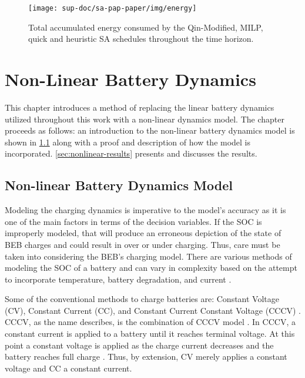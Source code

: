 \documentclass[ee,thesis]{usuthesis}
\begin{document}
\begin{figure}[htpb]
\centering \texttt{[image: sup-doc/sa-pap-paper/img/energy]}
    \caption{Total accumulated energy consumed by the Qin-Modified, MILP, quick and heuristic SA schedules throughout the time horizon.}
    \label{fig:energy-usage}
\end{figure}

\chapter{Non-Linear Battery Dynamics}
\label{sec:nonlinear-battery-dynamics}
This chapter introduces a method of replacing the linear battery dynamics utilized throughout this work with a
non-linear dynamics model. The chapter proceeds as follows: an introduction to the non-linear battery dynamics model is
shown in \ref{sec:nonlinear-model} along with a proof and description of how the model is incorporated.
\ref{sec:nonlinear-results} presents and discusses the results.

\section{Non-linear Battery Dynamics Model}
\label{sec:nonlinear-model}
Modeling the charging dynamics is imperative to the model's accuracy as it is one of the main factors in terms of the
decision variables. If the SOC is improperly modeled, that will produce an erroneous depiction of the state of BEB
charges and could result in over or under charging. Thus, care must be taken into considering the BEB's charging model.
There are various methods of modeling the SOC of a battery and can vary in complexity based on the attempt to
incorporate temperature, battery degradation, and current
\cite{zhang-2021-optim-elect,chen-2008-desig-grey,watrin-2012-multip-lithium}.

Some of the conventional methods to charge batteries are: Constant Voltage (CV), Constant Current (CC), and Constant
Current Constant Voltage (CCCV) \cite{arabsalmanabadi-2018-charg-techn}. CCCV, as the name describes, is the
combination of CCCV model \cite{abdollahi-2016-optim-batter,chen-2008-desig-grey,wang-2021-resear-optim}. In CCCV,
a constant current is applied to a battery until it reaches terminal voltage. At this point a constant voltage is
applied as the charge current decreases and the battery reaches full charge \cite{chen-2008-desig-grey}. Thus, by
extension, CV merely applies a constant voltage and CC a constant current.
\end{document}

